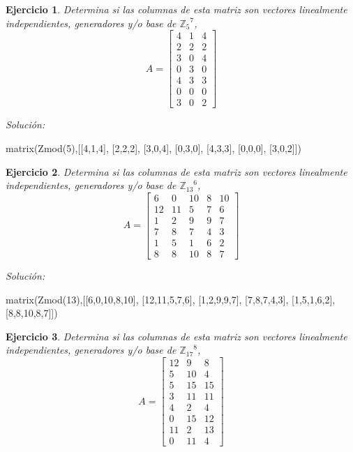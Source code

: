 \documentclass{amsart}
\newtheorem{ejer}{Ejercicio}
\begin{document}


\begin{ejer} Determina si las columnas de esta matriz son vectores linealmente independientes, generadores y/o base de ${{\mathbb Z}_{5}}^{7}$,
\[ A = \left[\begin{array}{rrr}
4 & 1 & 4 \\
2 & 2 & 2 \\
3 & 0 & 4 \\
0 & 3 & 0 \\
4 & 3 & 3 \\
0 & 0 & 0 \\
3 & 0 & 2
\end{array}\right] \]
\end{ejer}

{\it Soluci\'on:}

\begin{sageblock}
matrix(Zmod(5),[[4,1,4],
[2,2,2],
[3,0,4],
[0,3,0],
[4,3,3],
[0,0,0],
[3,0,2]])
\end{sageblock}



\begin{ejer} Determina si las columnas de esta matriz son vectores linealmente independientes, generadores y/o base de ${{\mathbb Z}_{13}}^{6}$,
\[ A = \left[\begin{array}{rrrrr}
6 & 0 & 10 & 8 & 10 \\
12 & 11 & 5 & 7 & 6 \\
1 & 2 & 9 & 9 & 7 \\
7 & 8 & 7 & 4 & 3 \\
1 & 5 & 1 & 6 & 2 \\
8 & 8 & 10 & 8 & 7
\end{array}\right] \]
\end{ejer}

{\it Soluci\'on:}

\begin{sageblock}
matrix(Zmod(13),[[6,0,10,8,10],
[12,11,5,7,6],
[1,2,9,9,7],
[7,8,7,4,3],
[1,5,1,6,2],
[8,8,10,8,7]])
\end{sageblock}



\begin{ejer} Determina si las columnas de esta matriz son vectores linealmente independientes, generadores y/o base de ${{\mathbb Z}_{17}}^{8}$,
\[ A = \left[\begin{array}{rrr}
12 & 9 & 8 \\
5 & 10 & 4 \\
5 & 15 & 15 \\
3 & 11 & 11 \\
4 & 2 & 4 \\
0 & 15 & 12 \\
11 & 2 & 13 \\
0 & 11 & 4
\end{array}\right] \]
\end{ejer}
\end{document}

